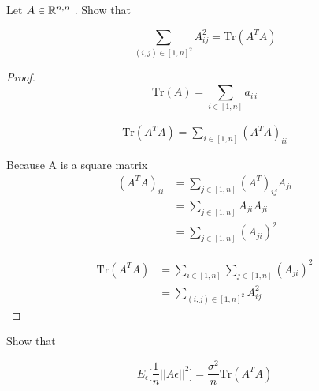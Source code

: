 
Let $A \in \mathbb{R} ^{n, n}$ . Show that

\begin{equation}\label{eq:exo2}
    \sum_{(i, j)  \in [1, n]^2} A^2_{ij} = \mathrm {Tr} (A^T A)
\end{equation}



\begin{proof}
    \begin{equation}
        \mathrm {Tr} (A) =\sum _{i\in[1, n]} a_{{i\,i}}
    \end{equation}
    
    \begin{align*}
        \mathrm {Tr} (A^T A) = \sum_{i \in [1, n]} (A^T A)_{ii}
    \end{align*}

    Because A is a square matrix
    \begin{align*}
        (A^T A)_{ii} &= \sum_{j \in [1, n]} (A^T)_{ij} A_{ji} \\
            &= \sum_{j \in [1, n]} A_{ji} A_{ji}\\
            &= \sum_{j \in [1, n]} (A_{ji})^2
    \end{align*}

    \begin{align*}
         \mathrm {Tr} (A^T A) &= \sum_{i \in [1, n]}  \sum_{j \in [1, n]} (A_{ji})^2\\
            &= \sum_{(i, j)  \in [1, n]^2} A^2_{ij}      
    \end{align*}
\end{proof}


Show that 

\begin{equation} \label{eq:exo3}
    E_\epsilon \Big[ \frac{1}{n} ||A\epsilon ||^2 \Big] = \frac{\sigma^2}{n} \mathrm {Tr} (A^T A)
\end{equation}

